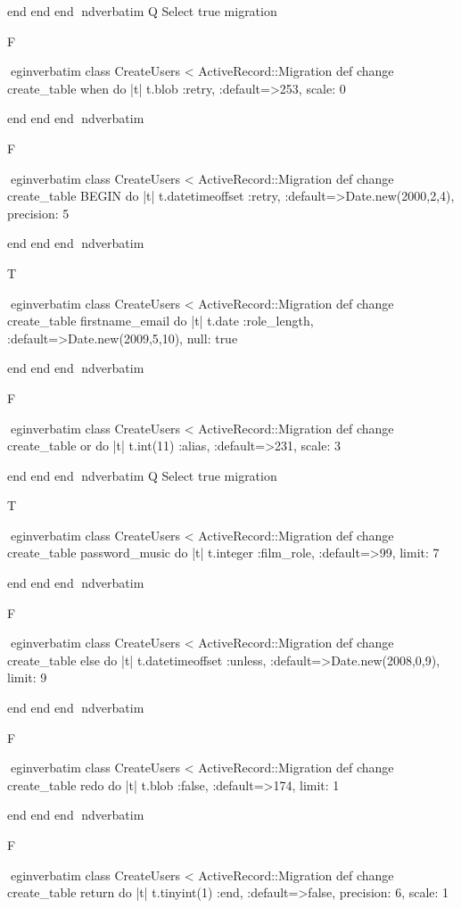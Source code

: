     end 
  end 
end
nd{verbatim}
Q
 Select true migration

F

egin{verbatim}
 class CreateUsers < ActiveRecord::Migration 
  def change 
    create_table when do |t| 
      t.blob :retry, :default=>253, scale: 0
    
    end 
  end 
end
nd{verbatim}

F

egin{verbatim}
 class CreateUsers < ActiveRecord::Migration 
  def change 
    create_table BEGIN do |t| 
      t.datetimeoffset :retry, :default=>Date.new(2000,2,4), precision: 5
    
    end 
  end 
end
nd{verbatim}

T

egin{verbatim}
 class CreateUsers < ActiveRecord::Migration 
  def change 
    create_table firstname_email do |t| 
      t.date :role_length, :default=>Date.new(2009,5,10), null: true
    
    end 
  end 
end
nd{verbatim}

F

egin{verbatim}
 class CreateUsers < ActiveRecord::Migration 
  def change 
    create_table or do |t| 
      t.int(11) :alias, :default=>231, scale: 3
    
    end 
  end 
end
nd{verbatim}
Q
 Select true migration

T

egin{verbatim}
 class CreateUsers < ActiveRecord::Migration 
  def change 
    create_table password_music do |t| 
      t.integer :film_role, :default=>99, limit: 7
    
    end 
  end 
end
nd{verbatim}

F

egin{verbatim}
 class CreateUsers < ActiveRecord::Migration 
  def change 
    create_table else do |t| 
      t.datetimeoffset :unless, :default=>Date.new(2008,0,9), limit: 9
    
    end 
  end 
end
nd{verbatim}

F

egin{verbatim}
 class CreateUsers < ActiveRecord::Migration 
  def change 
    create_table redo do |t| 
      t.blob :false, :default=>174, limit: 1
    
    end 
  end 
end
nd{verbatim}

F

egin{verbatim}
 class CreateUsers < ActiveRecord::Migration 
  def change 
    create_table return do |t| 
      t.tinyint(1) :end, :default=>false, precision: 6, scale: 1
    
